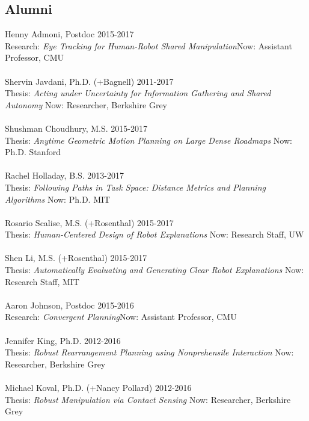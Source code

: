 \subsection{Alumni}
\noindent
Henny Admoni, Postdoc \hfill 2015-2017\\
Research: \textit{Eye Tracking for Human-Robot Shared Manipulation}\hfill Now: Assistant Professor, CMU\\
\\
Shervin Javdani, Ph.D. (+Bagnell) \hfill 2011-2017\\
Thesis: \textit{Acting under Uncertainty for Information Gathering and Shared Autonomy } \hfill Now: Researcher, Berkshire Grey\\
\\
Shushman Choudhury, M.S. \hfill 2015-2017\\
Thesis: \textit{Anytime Geometric Motion Planning on Large Dense Roadmaps} \hfill Now: Ph.D. Stanford\\
\\
Rachel Holladay, B.S. \hfill 2013-2017\\
Thesis: \textit{Following Paths in Task Space: Distance Metrics and Planning Algorithms} \hfill Now: Ph.D. MIT\\
\\
Rosario Scalise, M.S. (+Rosenthal) \hfill 2015-2017\\
Thesis: \textit{Human-Centered Design of Robot Explanations} \hfill Now: Research Staff, UW\\
\\
Shen Li, M.S. (+Rosenthal) \hfill 2015-2017\\
Thesis: \textit{Automatically Evaluating and Generating Clear Robot Explanations} \hfill Now: Research Staff, MIT\\
\\
Aaron Johnson, Postdoc \hfill 2015-2016\\
Research: \textit{Convergent Planning}\hfill Now: Assistant Professor, CMU\\
\\
Jennifer King, Ph.D. \hfill 2012-2016\\
Thesis: \textit{Robust Rearrangement Planning using Nonprehensile Interaction} \hfill Now: Researcher, Berkshire Grey\\
\\
Michael Koval, Ph.D. (+Nancy Pollard) \hfill 2012-2016\\
Thesis: \textit{Robust Manipulation via Contact Sensing} \hfill Now: Researcher, Berkshire Grey\\
